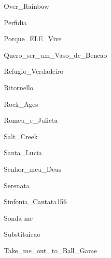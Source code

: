 \documentclass{scrartcl}
\begin{document}

{Over_Rainbow}


{Perfidia}


{Porque_ELE_Vive}


{Quero_ser_um_Vaso_de_Bencao}


{Refugio_Verdadeiro}


{Ritornello}


{Rock_Ages}


{Romeu_e_Julieta}


{Salt_Creek}


{Santa_Lucia}


{Senhor_meu_Deus}


{Serenata}


{Sinfonia_Cantata156}


{Sonda-me}


{Substituicao}


{Take_me_out_to_Ball_Game}
\end{document}
